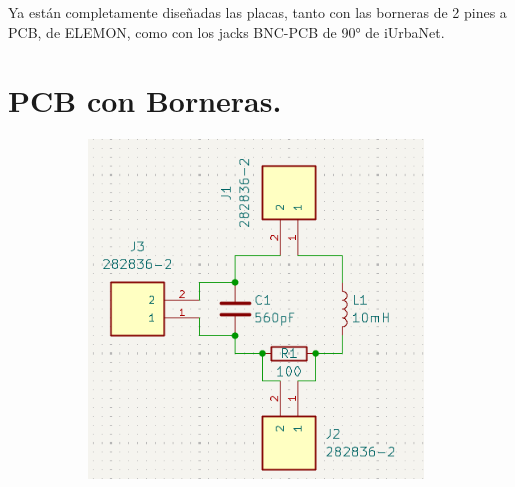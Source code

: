 Ya están completamente diseñadas las placas, tanto con las borneras de 2 pines a PCB, de ELEMON, como con los jacks BNC-PCB de 90° de iUrbaNet. 

\section{PCB con Borneras.}
\begin{figure}[!ht]
	\begin{minipage}[c]{0.3325\textwidth}
			\begin{subfigure}{\textwidth}
					\centering
					\includegraphics[width=0.978\textwidth]{Figures/02_06_2025/Schematic_borneras}
					\captionsetup{width=0.8\textwidth}
					\subcaption{}
				\end{subfigure}
		\end{minipage}\begin{minipage}[c]{0.332149\textwidth}
			\begin{subfigure}{\textwidth}
					\centering

\end{subfigure}
\end{minipage}
\end{figure}
